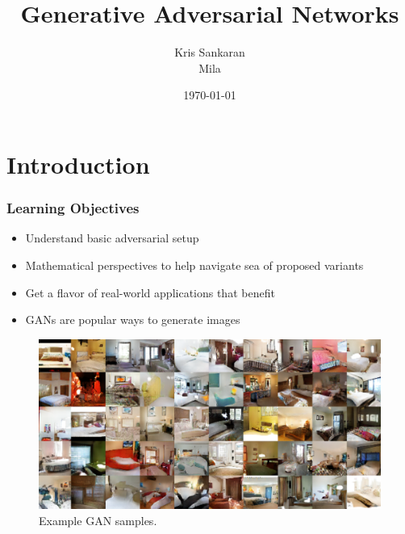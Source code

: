 \documentclass[10pt,mathserif]{beamer}
\title{\large \bfseries Generative Adversarial Networks}
\author{Kris Sankaran\\[3ex]
Mila}
\date{\today}
\begin{document}
\frame{
  \thispagestyle{empty}
  \titlepage
}

\section{Introduction}

\begin{frame}
  \frametitle{Learning Objectives}
 \begin{itemize}
  \item Understand basic adversarial setup
  \item Mathematical perspectives to help navigate sea of proposed variants
  \item Get a flavor of real-world applications that benefit
 \end{itemize}
\end{frame}

\begin{frame}
\begin{itemize}
\item GANs are popular ways to generate images
\end{itemize}
\begin{figure}[ht]
  \centering
  \includegraphics[width=0.7\paperwidth]{figure/gan_example}
  \caption{Example GAN samples. \label{fig:gan_example} }
\end{figure}
\end{frame}
\end{document}
